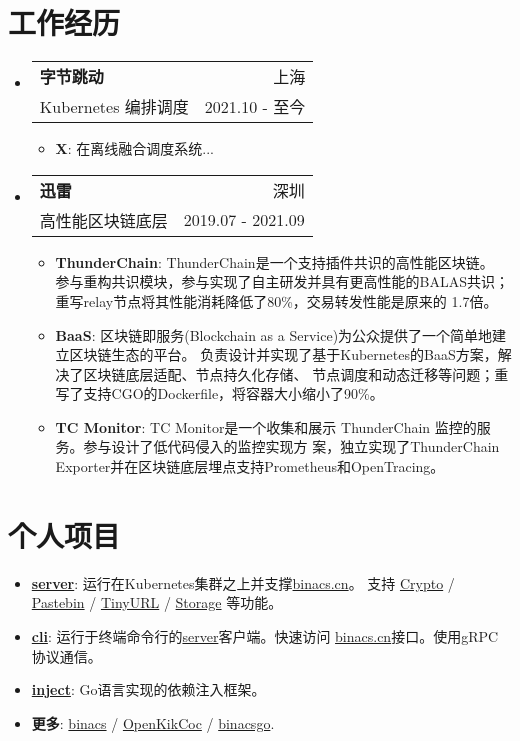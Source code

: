 \documentclass[letterpaper,12pt]{article}
\makeatletter
\newcommand{\resumeItem}[2]{
  \item\small{
    \textbf{#1}{: #2 \vspace{-2pt}}
  }
}
\newcommand{\resumeSubheading}[4]{
  \vspace{-1pt}\item
    \begin{tabular*}{0.97\textwidth}[t]{l@{\extracolsep{\fill}}r}
      \textbf{#1} & #2 \\
      \textup{\small#3} & \textup{\small #4} \\
    \end{tabular*}\vspace{-5pt}
}
\newcommand{\resumeSubItem}[2]{\resumeItem{#1}{#2}\vspace{-4pt}}
\newcommand{\resumeSubHeadingListStart}{\begin{itemize}[leftmargin=*]}
\newcommand{\resumeSubHeadingListEnd}{\end{itemize}}
\newcommand{\resumeItemListStart}{\begin{itemize}}
\newcommand{\resumeItemListEnd}{\end{itemize}\vspace{-5pt}}
\makeatother
\begin{document}
\begin{CJK*}{UTF8}{gbsn}
\section{工作经历}
  \resumeSubHeadingListStart
    \resumeSubheading
      {字节跳动}{上海}
      {Kubernetes 编排调度}{2021.10 - 至今}
      \resumeItemListStart
        \resumeItem{X}
          {在离线融合调度系统...}
      \resumeItemListEnd
    \resumeSubheading
      {迅雷}{深圳}
      {高性能区块链底层}{2019.07 - 2021.09}
      \resumeItemListStart
        \resumeItem{ThunderChain}
          {ThunderChain是一个支持插件共识的高性能区块链。
          参与重构共识模块，参与实现了自主研发并具有更高性能的BALAS共识；
          重写relay节点将其性能消耗降低了80\%，交易转发性能是原来的 1.7倍。}
        \resumeItem{BaaS}
          {区块链即服务(Blockchain as a Service)为公众提供了一个简单地建立区块链生态的平台。
          负责设计并实现了基于Kubernetes的BaaS方案，解决了区块链底层适配、节点持久化存储、
          节点调度和动态迁移等问题；重写了支持CGO的Dockerfile，将容器大小缩小了90\%。}
        \resumeItem{TC Monitor}
          {TC Monitor是一个收集和展示 ThunderChain 监控的服务。参与设计了低代码侵入的监控实现方
          案，独立实现了ThunderChain Exporter并在区块链底层埋点支持Prometheus和OpenTracing。}
      \resumeItemListEnd
  \resumeSubHeadingListEnd

\section{个人项目}
  \resumeSubHeadingListStart
    \resumeSubItem{\href{https://github.com/binacs/server}{server}}
      {运行在Kubernetes集群之上并支撑\href{https://binacs.cn/}{binacs.cn}。
      支持   \href{https://binacs.cn/toys/crypto}{Crypto} / 
                \href{https://binacs.cn/toys/pastebin}{Pastebin} / 
                \href{https://binacs.cn/toys/tinyurl}{TinyURL} / 
                \href{https://binacs.cn/toys/storage}{Storage}
      等功能。}
    \resumeSubItem{\href{https://github.com/binacs/cli}{cli}}
      {运行于终端命令行的\href{https://github.com/binacs/server}{server}客户端。快速访问
      \href{https://binacs.cn/}{binacs.cn}接口。使用gRPC协议通信。}
    \resumeSubItem{\href{https://github.com/binacsgo/inject}{inject}}
      {Go语言实现的依赖注入框架。}
    \resumeSubItem{更多}
      {\href{https://github.com/binacs}{binacs} /
       \href{https://github.com/OpenKikCoc}{OpenKikCoc} /
       \href{https://github.com/binacsgo}{binacsgo}.}
  \resumeSubHeadingListEnd

\end{CJK*}
\end{document}
